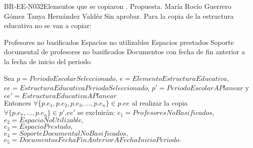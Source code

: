 \begin{BusinessRule}{BR-EE-N032}{Elementos que se copiaron}
	{\bcIntegridad}    %
	{\btEnabler}     %
	{\blControlling}    %
	.
	\BRItem[Estado] Propuesta.
	 María Rocío Guerrero Gómez
	 Tanya Hernández Valdéz %
	 Sin aprobar.
	\BRItem[Descripción] Para la copia de la estructura educativa no se van a copiar:
	\begin{Titemize}
		\Titem Profesores no basificados
		\Titem Espacios no utilizables
		\Titem Espacios prestados
		\Titem Soporte documental de profesores no basificados
		\Titem Documentos con fecha de fin anterior a la fecha de inicio del periodo
	\end{Titemize}	
	\BRItem[Sentencia]  Sea $p = PeriodoEscolarSeleccionado$, $e = ElementoEstructuraEducativa,$ \\
	$ ee = EstructuraEducativaPeriodoSeleccionado$, $p' = PeriodoEscolarAPlanear$ y $ee' = EstructuraEducativaAPlanear$ \\
	Entonces $\forall \{p.e_1,p.e_2,p.e_3,...,p.e_n\} \in p.ee$ al realizar la copia
	$ \forall \{p.e_7,...,p.e_n\} \in p'.ee'$ se excluirán:
	$e_1 = ProfesoresNoBasificados,$ \\
	$e_2 = EspacioNoUtilizable,$ \\
	$e_3 = EspacioPrestado,$ \\
	$e_4 = SoporteDocumentalNoBasificados,$ \\
	$e_5 = DocumentosFechaFinAnteriorAFechaInicioPeriodo.$ \\
	

\end{BusinessRule}
